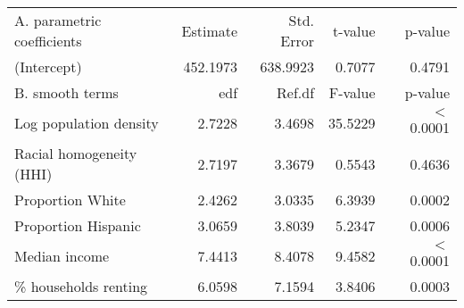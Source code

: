\begin{table}[ht]
\centering
\begin{tabular}{lrrrr}
   \hline
A. parametric coefficients & Estimate & Std. Error & t-value & p-value \\ 
  (Intercept) & 452.1973 & 638.9923 & 0.7077 & 0.4791 \\ 
   \hline
B. smooth terms & edf & Ref.df & F-value & p-value \\ 
  Log population density & 2.7228 & 3.4698 & 35.5229 & $<$ 0.0001 \\ 
  Racial homogeneity (HHI) & 2.7197 & 3.3679 & 0.5543 & 0.4636 \\ 
  Proportion White & 2.4262 & 3.0335 & 6.3939 & 0.0002 \\ 
  Proportion Hispanic & 3.0659 & 3.8039 & 5.2347 & 0.0006 \\ 
  Median income & 7.4413 & 8.4078 & 9.4582 & $<$ 0.0001 \\ 
  \% households renting & 6.0598 & 7.1594 & 3.8406 & 0.0003 \\ 
   \hline
\end{tabular}
\caption{ } 
\label{Demographic GAM}
\end{table}

